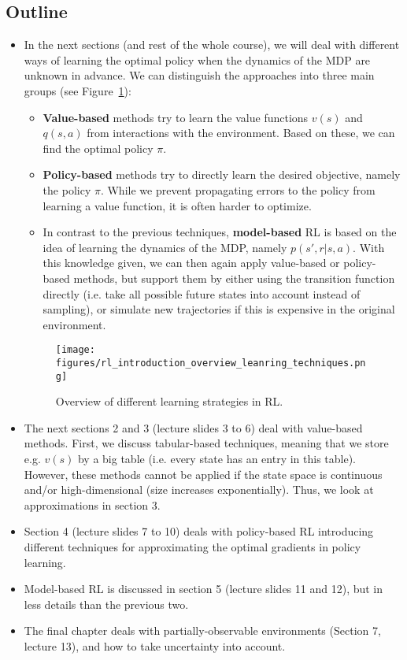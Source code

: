 \subsection{Outline}
\begin{itemize}
	\item In the next sections (and rest of the whole course), we will deal with different ways of learning the optimal policy when the dynamics of the MDP are unknown in advance. We can distinguish the approaches into three main groups (see Figure~\ref{fig:rl_introduction_overview_leanring_techniques}):
	\begin{itemize}
		\item \textbf{Value-based} methods try to learn the value functions $v(s)$ and $q(s,a)$ from interactions with the environment. Based on these, we can find the optimal policy $\pi$.
		\item \textbf{Policy-based} methods try to directly learn the desired objective, namely the policy $\pi$. While we prevent propagating errors to the policy from learning a value function, it is often harder to optimize.
		\item In contrast to the previous techniques, \textbf{model-based} RL is based on the idea of learning the dynamics of the MDP, namely $p(s',r|s,a)$. With this knowledge given, we can then again apply value-based or policy-based methods, but support them by either using the transition function directly (i.e. take all possible future states into account instead of sampling), or simulate new trajectories if this is expensive in the original environment. 
	\end{itemize}
	\begin{figure}[ht!]
		\centering
		\texttt{[image: figures/rl\_introduction\_overview\_leanring\_techniques.png]}
		\caption{Overview of different learning strategies in RL.}
		\label{fig:rl_introduction_overview_leanring_techniques}
	\end{figure}
	\item The next sections 2 and 3 (lecture slides 3 to 6) deal with value-based methods. First, we discuss tabular-based techniques, meaning that we store e.g. $v(s)$ by a big table (i.e. every state has an entry in this table). However, these methods cannot be applied if the state space is continuous and/or high-dimensional (size increases exponentially). Thus, we look at approximations in section 3.
	\item Section 4 (lecture slides 7 to 10) deals with policy-based RL introducing different techniques for approximating the optimal gradients in policy learning.
	\item Model-based RL is discussed in section 5 (lecture slides 11 and 12), but in less details than the previous two.
	\item The final chapter deals with partially-observable environments (Section 7, lecture 13), and how to take uncertainty into account.
\end{itemize}
